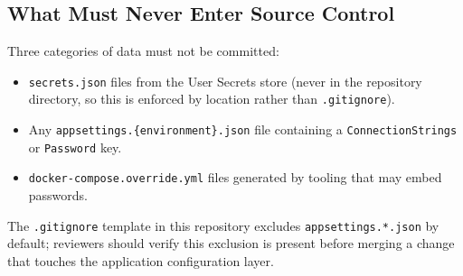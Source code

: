 \subsection{What Must Never Enter Source Control}

Three categories of data must not be committed:

\begin{itemize}
  \item \texttt{secrets.json} files from the User Secrets store (never in the repository directory, so this is enforced by location rather than \texttt{.gitignore}).
  \item Any \texttt{appsettings.\{environment\}.json} file containing a \texttt{ConnectionStrings} or \texttt{Password} key.
  \item \texttt{docker-compose.override.yml} files generated by tooling that may embed passwords.
\end{itemize}

The \texttt{.gitignore} template in this repository excludes \texttt{appsettings.*.json} by default; reviewers should verify this exclusion is present before merging a change that touches the application configuration layer.
